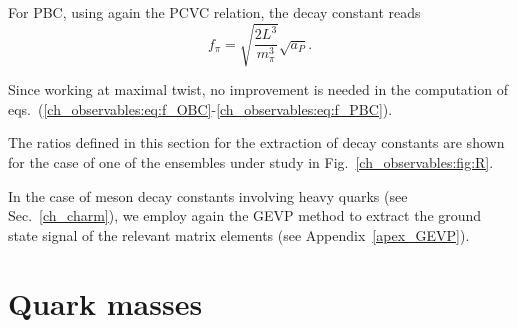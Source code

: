 For PBC, using again the PCVC relation, the decay constant reads
\begin{equation}
\label{ch_observables:eq:f_PBC}
f_{\pi}=\sqrt{\frac{2L^3}{m_{\pi}^3}}\sqrt{a_P}.
\end{equation}

Since working at maximal twist, no improvement is needed in the computation of eqs.~(\ref{ch_observables:eq:f_OBC}-\ref{ch_observables:eq:f_PBC}).

The ratios defined in this section for the extraction of decay constants are shown for the case of one of the ensembles under study in Fig.~\ref{ch_observables:fig:R}.

In the case of meson decay constants involving heavy quarks (see Sec.~\ref{ch_charm}), we employ again the GEVP method to extract the ground state signal of the relevant matrix elements (see Appendix~\ref{apex_GEVP}).


\section{Quark masses}
\label{ch_observables:sec:quark_mass}

